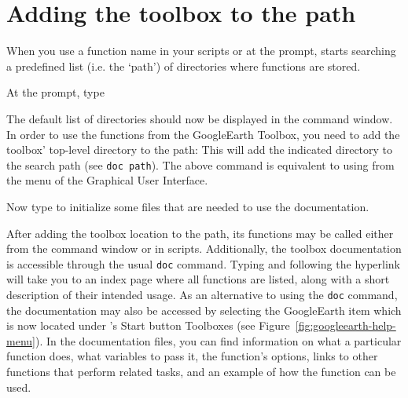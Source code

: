 \section{Adding the toolbox to the path}
When you use a function name in your scripts or at the prompt, \MATLAB{} starts searching a predefined list (i.e. the `path') of directories where \MATLAB{} functions are stored. 
\begin{action}
At the prompt, type
\end{action}
The default list of directories should now be displayed in the command window. In order to use the functions from the GoogleEarth Toolbox, you need to add the toolbox' top-level directory to the path:
\noindent This will add the indicated directory to the \MATLAB{} search path (see {\tt doc path}). The above command is equivalent to using  from the  menu of the \MATLAB{} Graphical User Interface. 

\begin{action}
Now type
to initialize some files that are needed to use the documentation.
\end{action}
\vspace{1em}
\noindent After adding the toolbox location to the \MATLAB{} path, its functions may be called either from the command window or in scripts. Additionally, the toolbox documentation is accessible through the usual {\tt doc} command. Typing
\noindent and following the hyperlink will take you to an index page where all functions are listed, along with a short description of their intended usage. As an alternative to using the {\tt doc} command, the documentation may also be accessed by selecting the GoogleEarth item which is now located under \MATLAB{}'s Start button  Toolboxes (see Figure~\ref{fig:googleearth-help-menu}). In the documentation files, you can find information on what a particular function does, what variables to pass it, the function's options, links to other functions that perform related tasks, and an example of how the function can be used.


